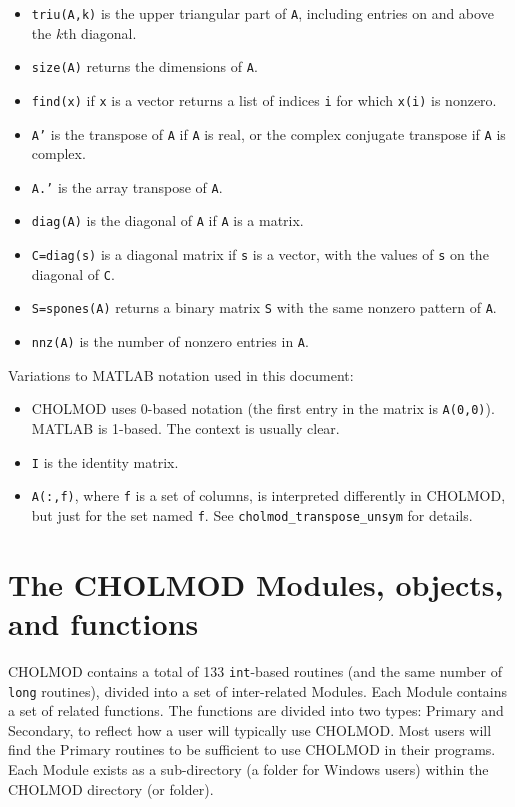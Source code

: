 \documentclass[11pt]{article}
\begin{document}
\begin{itemize}
    \item {\tt triu(A,k)} is the upper triangular part of {\tt A}, including entries
	on and above the $k$th diagonal.
    \item {\tt size(A)} returns the dimensions of {\tt A}.
    \item {\tt find(x)} if {\tt x} is a vector returns a list of indices {\tt i}
	for which {\tt x(i)} is nonzero.
    \item {\tt A'} is the transpose of {\tt A} if {\tt A} is real, or
	the complex conjugate transpose if {\tt A} is complex.
    \item {\tt A.'} is the array transpose of {\tt A}.
    \item {\tt diag(A)} is the diagonal of {\tt A} if {\tt A} is a matrix.
    \item {\tt C=diag(s)} is a diagonal matrix if {\tt s} is a vector,
	with the values of {\tt s} on the diagonal of {\tt C}.
    \item {\tt S=spones(A)} returns a binary matrix {\tt S} with the
	same nonzero pattern of {\tt A}.
    \item {\tt nnz(A)} is the number of nonzero entries in {\tt A}.
\end{itemize}

\noindent Variations to MATLAB notation used in this document:
\begin{itemize}
    \item CHOLMOD uses 0-based notation (the first entry in the matrix is
	{\tt A(0,0)}).  MATLAB is 1-based.  The context is usually clear.
    \item {\tt I} is the identity matrix.
    \item {\tt A(:,f)}, where {\tt f} is a set of columns, is interpreted
	differently in CHOLMOD, but just for the set named {\tt f}.
	See {\tt cholmod\_transpose\_unsym} for details.
\end{itemize}

\newpage \section{The CHOLMOD Modules, objects, and functions}
\label{Modules}

CHOLMOD contains a total of 133 {\tt int}-based routines (and the same number
of {\tt long} routines), divided into a set of inter-related
Modules.  Each Module contains a set of related functions.  The functions
are divided into two types: Primary and Secondary, to reflect how a user will
typically use CHOLMOD.  Most users will find the Primary routines to be
sufficient to use CHOLMOD in their programs.  Each Module exists as a
sub-directory (a folder for Windows users) within the CHOLMOD directory
(or folder).
\end{document}
